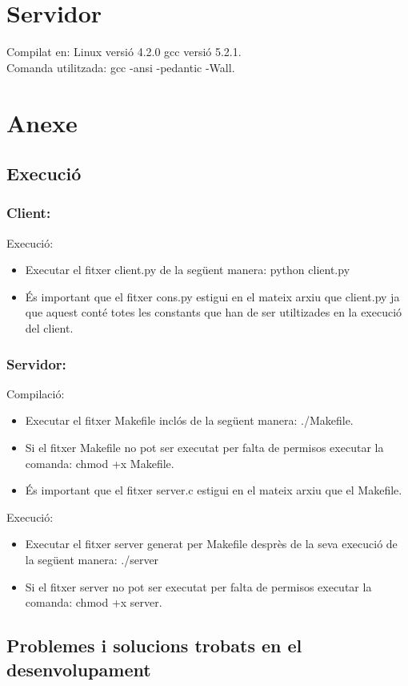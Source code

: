 \documentclass[11pt]{article}
\begin{document}
\section{Servidor}
Compilat en: Linux versió 4.2.0 gcc versió 5.2.1.\\
Comanda utilitzada: gcc -ansi -pedantic -Wall.
\newpage
\section{Anexe}
	\subsection{Execució}
		\subsubsection*{Client:}
Execució:
\begin{itemize}
\item Executar el fitxer client.py de la següent manera: python client.py
\item És important que el fitxer cons.py estigui en el mateix arxiu que client.py ja que aquest conté totes les constants que han de ser utiltizades en la execució del client.
\end{itemize} 
		\subsubsection*{Servidor:}
Compilació:
\begin{itemize}
\item Executar el fitxer Makefile inclós de la següent manera: ./Makefile.
\item Si el fitxer Makefile no pot ser executat per falta de permisos executar la comanda: chmod +x Makefile. 
\item És important que el fitxer server.c estigui en el mateix arxiu que el Makefile.
\end{itemize}
Execució:
\begin{itemize}
\item Executar el fitxer server generat per Makefile desprès de la seva execució de la següent manera: ./server
\item Si el fitxer server no pot ser executat per falta de permisos executar la comanda: chmod +x server.
\end{itemize}
	\subsection{Problemes i solucions trobats en el desenvolupament}
\end{document}
